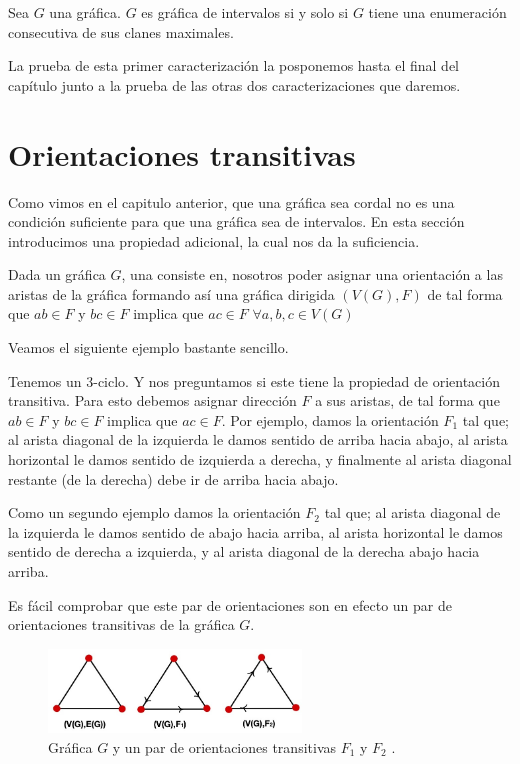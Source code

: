 \begin{teorema}
    \label{teo:Int-MaxClns}
    Sea $G$ una gráfica. $G$ es gráfica de intervalos si y solo si $G$ tiene una enumeración consecutiva de sus clanes maximales.
\end{teorema}

La prueba de esta primer caracterización la posponemos hasta el final del capítulo junto a la prueba de las otras dos caracterizaciones que daremos.

\section{Orientaciones transitivas}
Como vimos en el capitulo anterior, que una gráfica sea cordal no es una condición suficiente para que una gráfica sea de intervalos. En esta sección introducimos una propiedad adicional, la cual nos da la suficiencia.

Dada un gráfica $G$, una  consiste en, nosotros poder asignar una orientación a las aristas de la gráfica formando así una gráfica dirigida $(V(G),F)$ de tal forma que $ab\in F$ y $bc\in F$ implica que $ac\in F$ $\forall a,b,c \in V(G)$

Veamos el siguiente ejemplo bastante sencillo.

Tenemos un 3-ciclo. Y nos preguntamos si este tiene la propiedad de orientación transitiva. Para esto debemos asignar dirección $F$ a sus aristas, de tal forma que $ab\in F$ y $bc\in F$ implica que $ac\in F$.
Por ejemplo, damos la orientación $F_1$ tal que; al arista diagonal de la izquierda le damos sentido de arriba hacia abajo, al arista horizontal le damos sentido de izquierda a derecha, y finalmente al arista diagonal restante (de la derecha) debe ir de arriba hacia abajo.
    
Como un segundo ejemplo damos la orientación $F_2$ tal que; al arista diagonal de la izquierda le damos sentido de abajo hacia arriba, al arista horizontal le damos sentido de derecha a izquierda, y al arista diagonal de la derecha abajo hacia arriba.

Es fácil comprobar que este par de orientaciones son en efecto un par de orientaciones transitivas de la gráfica $G$.


\begin{figure}[H]
  \centering
  \includegraphics[width=0.6\textwidth]{recursos/capturas/205.jpg}
  \caption{ Gráfica $G$ y un par de orientaciones transitivas $F_1$ y $F_2$ .}
  \label{fig:GrfTrnsOrtbl}
\end{figure}

